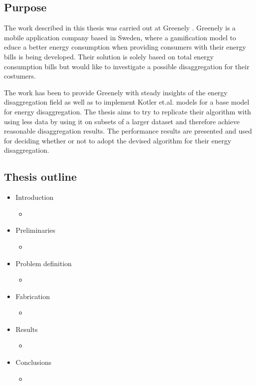\subsection{Purpose}

The work described in this thesis was carried out at Greenely \protect\footnotemark. Greenely is a mobile application company based in Sweden, where a gamification model to educe a better energy consumption when providing consumers with their energy bills is being developed. Their solution is solely based on total energy consumption bills but would like to investigate a possible disaggregation for their costumers.


The work has been to provide Greenely with steady insights of the energy disaggregation field as well as to implement Kotler et.al. models for a base model for energy disaggregation. The thesis aims to try to replicate their algorithm with using less data by using it on subsets of a larger dataset and therefore achieve reasonable disaggregation results. The performance results are presented and used for deciding whether or not to adopt the devised algorithm for their energy disaggregation.

\pagebreak[3]
\subsection{Thesis outline}
\label{sec:outline}
\begin{itemize}
	\item{Introduction}
	\begin{itemize}
		\item{\intOverview}
	\end{itemize}
	\item{Preliminaries}
	\begin{itemize}
		\item{}\preOverview
	\end{itemize}
	\item{Problem definition}
	\begin{itemize}
		\item{}\proOverview
	\end{itemize}
	\item{Fabrication}
	\begin{itemize} 
		\item{}\fabOverview
	\end{itemize}
	\item{Results}
	\begin{itemize}
		\item{}\resOverview
	\end{itemize}
	\item{Conclusions}
	\begin{itemize}
		\item{}\conOverview
	\end{itemize}
\end{itemize}